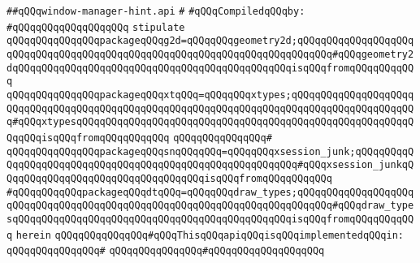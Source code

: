 \label{src/lib/x-kit/xclient/src/iccc/window-manager-hint.api}
\verb|##qQQqwindow-manager-hint.api|\newline
\verb|#|\newline
\newline
\verb|#qQQqCompiledqQQqby:|\newline
\verb|#qQQqqQQqqQQqqQQqqQQq|\newline
\newline
\verb|stipulate|\newline
\verb|qQQqqQQqqQQqqQQqpackageqQQqg2d=qQQqqQQqgeometry2d;qQQqqQQqqQQqqQQqqQQqqQQqqQQqqQQqqQQqqQQqqQQqqQQqqQQqqQQqqQQqqQQqqQQqqQQqqQQq#qQQqgeometry2dqQQqqQQqqQQqqQQqqQQqqQQqqQQqqQQqqQQqqQQqqQQqqQQqisqQQqfromqQQqqQQqqQQq|\newline
\verb|qQQqqQQqqQQqqQQqpackageqQQqxtqQQq=qQQqqQQqxtypes;qQQqqQQqqQQqqQQqqQQqqQQqqQQqqQQqqQQqqQQqqQQqqQQqqQQqqQQqqQQqqQQqqQQqqQQqqQQqqQQqqQQqqQQqqQQq#qQQqxtypesqQQqqQQqqQQqqQQqqQQqqQQqqQQqqQQqqQQqqQQqqQQqqQQqqQQqqQQqqQQqqQQqisqQQqfromqQQqqQQqqQQq|\newline
\verb|qQQqqQQqqQQqqQQq#|\newline
\verb|qQQqqQQqqQQqqQQqpackageqQQqsnqQQqqQQq=qQQqqQQqxsession_junk;qQQqqQQqqQQqqQQqqQQqqQQqqQQqqQQqqQQqqQQqqQQqqQQqqQQqqQQqqQQq#qQQqxsession_junkqQQqqQQqqQQqqQQqqQQqqQQqqQQqqQQqqQQqisqQQqfromqQQqqQQqqQQq|\newline
\verb|#qQQqqQQqqQQqpackageqQQqdtqQQq=qQQqqQQqdraw_types;qQQqqQQqqQQqqQQqqQQqqQQqqQQqqQQqqQQqqQQqqQQqqQQqqQQqqQQqqQQqqQQqqQQqqQQqqQQq#qQQqdraw_typesqQQqqQQqqQQqqQQqqQQqqQQqqQQqqQQqqQQqqQQqqQQqqQQqisqQQqfromqQQqqQQqqQQq|\newline
\verb|herein|\newline
\newline
\verb|qQQqqQQqqQQqqQQq#qQQqThisqQQqapiqQQqisqQQqimplementedqQQqin:|\newline
\verb|qQQqqQQqqQQqqQQq#|\newline
\verb|qQQqqQQqqQQqqQQq#qQQqqQQqqQQqqQQqqQQq|\newline
